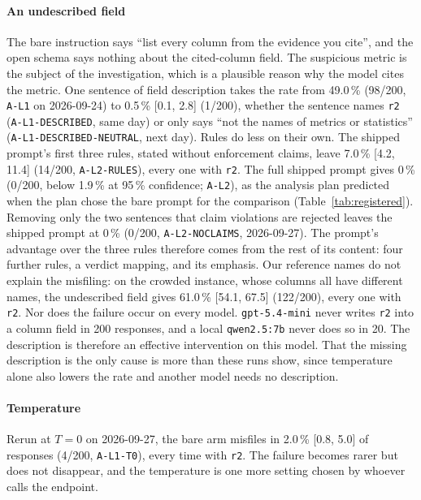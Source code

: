 \documentclass[journal]{IEEEtran}
\begin{document}
\paragraph{An undescribed field}
The bare instruction says ``list every column from the evidence you cite'',
and the open schema says nothing about the cited-column field. The suspicious
metric is the subject of the investigation, which is a plausible reason why
the model cites the metric. One sentence of field description takes the rate
from 49.0\,\% (98/200, \texttt{A-L1} on 2026-09-24) to 0.5\,\% [0.1, 2.8]
(1/200), whether the sentence names \texttt{r2} (\texttt{A-L1-DESCRIBED}, same
day) or only says ``not the names of metrics or statistics''
(\texttt{A-L1-DESCRIBED-NEUTRAL}, next day). Rules do less on their own. The
shipped prompt's first three rules, stated without enforcement claims, leave
7.0\,\% [4.2, 11.4] (14/200, \texttt{A-L2-RULES}), every one with
\texttt{r2}. The full shipped prompt gives 0\,\% (0/200, below 1.9\,\% at
95\,\% confidence; \texttt{A-L2}), as the analysis plan predicted when the
plan chose the bare prompt for the comparison (Table~\ref{tab:registered}).
Removing only the two sentences that claim violations are rejected leaves the
shipped prompt at 0\,\% (0/200, \texttt{A-L2-NOCLAIMS}, 2026-09-27). The
prompt's advantage over the three rules therefore comes from the rest of its
content: four further rules, a verdict mapping, and its emphasis. Our
reference names do not explain the misfiling: on the crowded instance, whose
columns all have different names, the undescribed field gives 61.0\,\% [54.1,
67.5] (122/200), every one with \texttt{r2}. Nor does the failure occur on
every model. \texttt{gpt-5.4-mini} never writes \texttt{r2} into a column
field in 200 responses, and a local \texttt{qwen2.5:7b} never does so in 20.
The description is therefore an effective intervention on this model. That
the missing description is the only cause is more than these runs show, since
temperature alone also lowers the rate and another model needs no
description.

\paragraph{Temperature}
Rerun at $T=0$ on 2026-09-27, the bare arm misfiles in 2.0\,\% [0.8, 5.0] of
responses (4/200, \texttt{A-L1-T0}), every time with \texttt{r2}. The failure
becomes rarer but does not disappear, and the temperature is one more setting
chosen by whoever calls the endpoint.
\end{document}
